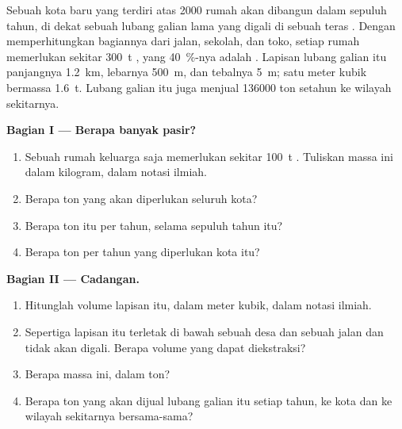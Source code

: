 \begin{problem}
\label{pb:g9:earth-resources:1}
Sebuah kota baru yang terdiri atas \num{2000} rumah akan dibangun dalam
sepuluh tahun, di dekat sebuah lubang galian  lama yang digali di
 sebuah teras . Dengan memperhitungkan bagiannya dari jalan,
sekolah, dan toko, setiap rumah memerlukan sekitar \qty{300}{t} ,
yang \qty{40}{\%}-nya adalah . Lapisan  lubang galian itu
panjangnya \qty{1.2}{km}, lebarnya \qty{500}{m}, dan tebalnya
\qty{5}{m}; satu meter kubik  bermassa \qty{1.6}{t}. Lubang
galian itu juga menjual \num{136000} ton  setahun ke wilayah
sekitarnya.

\noindent\textbf{Bagian I --- Berapa banyak pasir?}\par\nopagebreak
\begin{enumerate}[beginpenalty=10000]
  \item Sebuah rumah keluarga saja memerlukan sekitar \qty{100}{t}
        . Tuliskan massa ini dalam kilogram, dalam notasi ilmiah.
  \item Berapa ton  yang akan diperlukan seluruh kota?
  \item Berapa ton itu per tahun, selama sepuluh tahun itu?
  \item Berapa ton  per tahun yang diperlukan kota itu?
\end{enumerate}

\noindent\textbf{Bagian II --- Cadangan.}\par\nopagebreak
\begin{enumerate}[resume, beginpenalty=10000]
  \item Hitunglah volume lapisan  itu, dalam meter kubik, dalam
        notasi ilmiah.
  \item Sepertiga lapisan itu terletak di bawah sebuah desa dan sebuah
        jalan dan tidak akan digali. Berapa volume yang dapat diekstraksi?
  \item Berapa massa  ini, dalam ton?
  \item Berapa ton  yang akan dijual lubang galian itu setiap tahun,
        ke kota dan ke wilayah sekitarnya bersama-sama?
\end{enumerate}


\end{problem}
